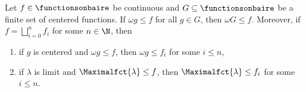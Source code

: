 \begin{lemma}\label{Intertwinereductionsforomegacentered}
Let $f\in\functionsonbaire$ be continuous and $G\subseteq\functionsonbaire$ be a finite set of centered functions.
If $\omega g \leq f$ for all $g\in G$, then $\omega G \leq f$. 
Moreover, if $f=\bigsqcup_{i=0}^{n} f_i$ for some $n\in\N$, then
\begin{enumerate}
\item if $g$ is centered and $\omega g\leq f$, then $\omega g\leq f_i$ for some $i\leq n$,
\item if $\lambda$ is limit and $\Maximalfct{\lambda}\leq f$, then $\Maximalfct{\lambda} \leq f_i$ for some $i\leq n$.
\end{enumerate}
\end{lemma}
%
%
